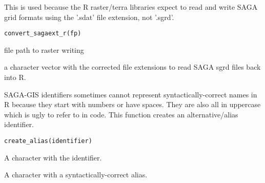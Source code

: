 \documentclass[a4paper]{book}
\begin{document}
%
\begin{Description}
This is used because the R raster/terra libraries expect to read and write
SAGA grid formats using the '.sdat' file extension, not '.sgrd'.
\end{Description}
%
\begin{Usage}
\begin{verbatim}
convert_sagaext_r(fp)
\end{verbatim}
\end{Usage}
%
\begin{Arguments}
\begin{ldescription}
\item[\code{fp}] file path to raster writing
\end{ldescription}
\end{Arguments}
%
\begin{Value}
a character vector with the corrected file extensions to read SAGA
sgrd files back into R.
\end{Value}
%
\begin{Description}
SAGA-GIS identifiers sometimes cannot represent syntactically-correct names
in R because they start with numbers or have spaces. They are also all in
uppercase which is ugly to refer to in code. This function creates an
alternative/alias identifier.
\end{Description}
%
\begin{Usage}
\begin{verbatim}
create_alias(identifier)
\end{verbatim}
\end{Usage}
%
\begin{Arguments}
\begin{ldescription}
\item[\code{identifier}] A character with the identifier.
\end{ldescription}
\end{Arguments}
%
\begin{Value}
A character with a syntactically-correct alias.
\end{Value}
\end{document}
